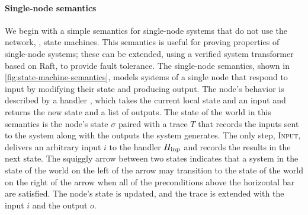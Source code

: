 \paragraph{Single-node semantics} We begin with a simple semantics for
single-node systems that do not use the network, \ie, state machines.
%
This semantics is useful for proving properties of single-node systems;
these can be extended, using a verified system transformer based on Raft,
to provide fault tolerance.
%
The single-node semantics, shown in \cref{fig:state-machine-semantics},
models systems of a single node that respond to input by modifying their
state and producing output.
%
The node's behavior is described by a handler \fHinp, which takes the current
local state and an input and returns the new state and a list of outputs.
%
The state of the world in this semantics is the node's state $\sigma$
paired with a trace $T$ that records the inputs sent to the system along
with the outputs the system generates.
%
The only step, \textsc{Input}, delivers an arbitrary input $i$ to the
handler $H_{\mathrm{inp}}$ and records the results in the next state.
%
The squiggly arrow between two states indicates that a system in the
state of the world on the left of the arrow may transition to the
state of the world on the right of the arrow when all of the
preconditions above the horizontal bar are satisfied. The node's state
is updated, and the trace is extended with the input $i$ and the
output $o$.

